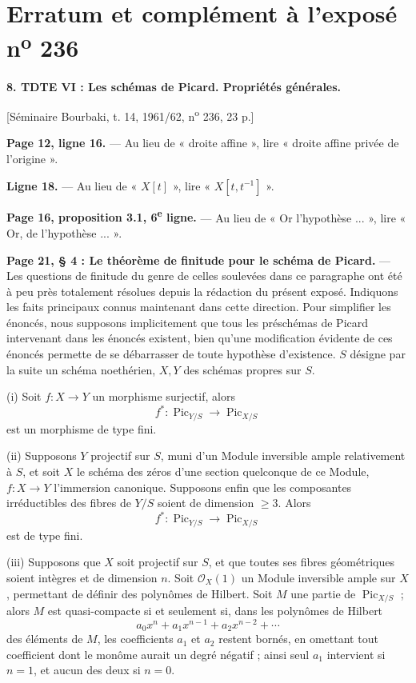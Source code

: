 \clearpage
\chapter*{Erratum et complément à l'exposé n\textsuperscript{o} 236}

\noindent\textbf{8. TDTE VI : Les schémas de Picard. Propriétés générales.}

\begin{center}
[Séminaire Bourbaki, t. 14, 1961/62, n\textsuperscript{o} 236, 23 p.]
\end{center}

\noindent\textbf{Page 12, ligne 16.} --- Au lieu de « droite affine », lire
« droite affine privée de l'origine ».

\noindent\textbf{Ligne 18.} --- Au lieu de « $X[t]$ », lire
« $X[t,t^{-1}]$ ».

\noindent\textbf{Page 16, proposition 3.1, 6\textsuperscript{e} ligne.} ---
Au lieu de « Or l'hypothèse ... », lire « Or, de l'hypothèse ... ».

\noindent\textbf{Page 21, § 4 : Le théorème de finitude pour le schéma de
Picard.} --- Les questions de finitude du genre de celles soulevées dans ce
paragraphe ont été à peu près totalement résolues depuis la rédaction du
présent exposé. Indiquons les faits principaux connus maintenant dans cette
direction. Pour simplifier les énoncés, nous supposons implicitement que tous
les préschémas de Picard intervenant dans les énoncés existent, bien qu'une
modification évidente de ces énoncés permette de se débarrasser de toute
hypothèse d'existence. $S$ désigne par la suite un schéma noethérien, $X,Y$ des
schémas propres sur $S$.

\medskip
\noindent(i) Soit $f:X\longrightarrow Y$ un morphisme surjectif, alors
\[
f^*: \operatorname{Pic}_{Y/S}\longrightarrow\operatorname{Pic}_{X/S}
\]
est un morphisme de type fini.

\noindent(ii) Supposons $Y$ projectif sur $S$, muni d'un Module inversible
ample relativement à $S$, et soit $X$ le schéma des zéros d'une section
quelconque de ce Module, $f:X\longrightarrow Y$ l'immersion canonique.
Supposons enfin que les composantes irréductibles des fibres de $Y/S$ soient de
dimension $\geq3$. Alors
\[
f^*: \operatorname{Pic}_{Y/S}\longrightarrow\operatorname{Pic}_{X/S}
\]
est de type fini.

\noindent(iii) Supposons que $X$ soit projectif sur $S$, et que toutes ses
fibres géométriques soient intègres et de dimension $n$. Soit
$\mathcal O_X(1)$ un Module inversible ample sur $X$, permettant de définir
des polynômes de Hilbert. Soit $M$ une partie de
$\operatorname{Pic}_{X/S}$ ; alors $M$ est quasi-compacte si et seulement si,
dans les polynômes de Hilbert
\[
a_0x^n+a_1x^{n-1}+a_2x^{n-2}+\cdots
\]
des éléments de $M$, les coefficients $a_1$ et $a_2$ restent bornés, en omettant tout coefficient dont le monôme aurait un degré négatif ; ainsi seul $a_1$ intervient si $n=1$, et aucun des deux si $n=0$.

